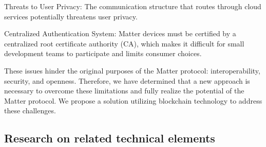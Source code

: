 \documentclass[conference]{IEEEtran}
\begin{document}
Threats to User Privacy: The communication structure that routes through cloud services potentially threatens user privacy.

Centralized Authentication System: Matter devices must be certified by a centralized root certificate authority (CA), which makes it difficult for small development teams to participate and limits consumer choices.

These issues hinder the original purposes of the Matter protocol: interoperability, security, and openness. Therefore, we have determined that a new approach is necessary to overcome these limitations and fully realize the potential of the Matter protocol. We propose a solution utilizing blockchain technology to address these challenges.

\subsection{Research on related technical elements}
\end{document}
